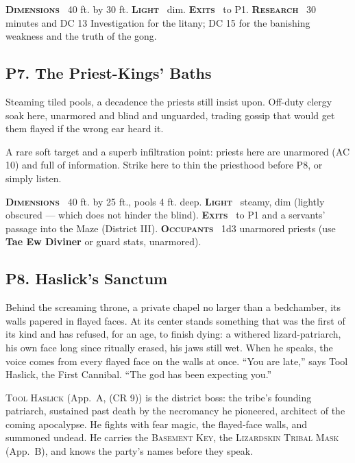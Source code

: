 \documentclass[10pt,twoside]{article}
\newcommand{\tech}[1]{\textbf{\scshape\textcolor{stone}{#1}}\ }
\newcommand{\CR}[1]{\textnormal{(CR #1)}}
\newcommand{\eqname}[1]{\textsc{#1}}
\begin{document}
\begin{techbox}
\tech{Dimensions} 40 ft. by 30 ft. \tech{Light} dim. \tech{Exits} to P1.
\tech{Research} 30 minutes and DC 13 Investigation for the litany; DC 15 for the
banishing weakness and the truth of the gong.
\end{techbox}

\subsection{P7. The Priest-Kings' Baths}
\begin{readaloud}
Steaming tiled pools, a decadence the priests still insist upon. Off-duty clergy soak
here, unarmored and blind and unguarded, trading gossip that would get them flayed if
the wrong ear heard it.
\end{readaloud}
A rare soft target and a superb infiltration point: priests here are unarmored (AC 10)
and full of information. Strike here to thin the priesthood before P8, or simply
listen.

\begin{techbox}
\tech{Dimensions} 40 ft. by 25 ft., pools 4 ft. deep. \tech{Light} steamy, dim
(lightly obscured --- which does not hinder the blind). \tech{Exits} to P1 and a
servants' passage into the Maze (District III). \tech{Occupants} 1d3 unarmored
priests (use \textbf{Tae Ew Diviner} or guard stats, unarmored).
\end{techbox}

\subsection{P8. Haslick's Sanctum}
\begin{readaloud}
Behind the screaming throne, a private chapel no larger than a bedchamber, its walls
papered in flayed faces. At its center stands something that was the first of its
kind and has refused, for an age, to finish dying: a withered lizard-patriarch, his
own face long since ritually erased, his jaws still wet. When he speaks, the voice
comes from every flayed face on the walls at once. ``You are late,'' says Tool
Haslick, the First Cannibal. ``The god has been expecting you.''
\end{readaloud}
\eqname{Tool Haslick} (App.\ A, \CR{9}) is the district boss: the tribe's founding
patriarch, sustained past death by the necromancy he pioneered, architect of the
coming apocalypse. He fights with fear magic, the flayed-face walls, and summoned
undead. He carries the \eqname{Basement Key}, the \eqname{Lizardskin Tribal Mask}
(App.\ B), and knows the party's names before they speak.
\end{document}
